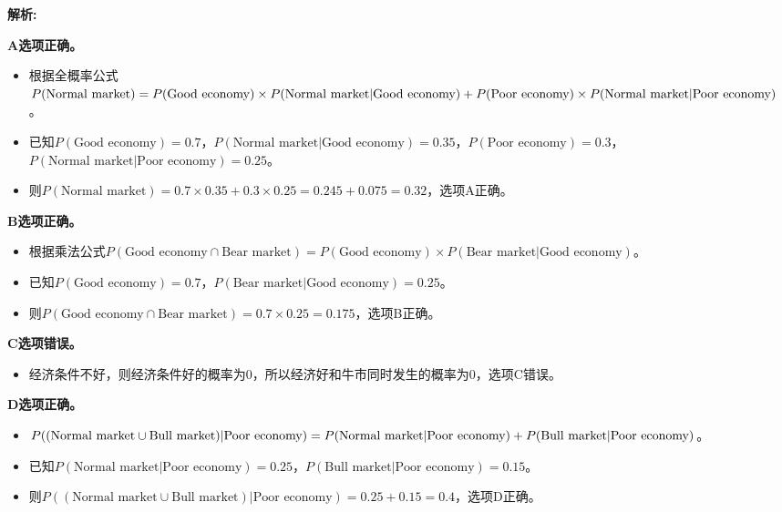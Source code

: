 \documentclass{article}
\newenvironment{explanation}
{\textbf{解析:}\par}
{\par}
\begin{document}
    \begin{explanation}
        \textbf{A选项正确。}
        \begin{itemize}
            \item 根据全概率公式\(P(\text{Normal market})=P(\text{Good economy})\times P(\text{Normal market}|\text{Good economy})\\+P(\text{Poor economy})\times P(\text{Normal market}|\text{Poor economy})\)。
            \item 已知\(P(\text{Good economy}) = 0.7\)，\(P(\text{Normal market}|\text{Good economy})=0.35\)，\(P(\text{Poor economy}) = 0.3\)，\\ \(P(\text{Normal market}|\text{Poor economy})=0.25\)。
            \item 则\(P(\text{Normal market})=0.7\times0.35 + 0.3\times0.25=0.245+0.075 = 0.32\)，选项A正确。
        \end{itemize}
    
        \textbf{B选项正确。}
        \begin{itemize}
            \item 根据乘法公式\(P(\text{Good economy}\cap\text{Bear market})=P(\text{Good economy})\times P(\text{Bear market}|\text{Good economy})\)。
            \item 已知\(P(\text{Good economy}) = 0.7\)，\(P(\text{Bear market}|\text{Good economy})=0.25\)。
            \item 则\(P(\text{Good economy}\cap\text{Bear market})=0.7\times0.25 = 0.175\)，选项B正确。
        \end{itemize}
    
        \textbf{C选项错误。}
        \begin{itemize}
            \item  经济条件不好，则经济条件好的概率为0，所以经济好和牛市同时发生的概率为0，选项C错误。
        \end{itemize}
    
        \textbf{D选项正确。}
        \begin{itemize}
            \item \(P((\text{Normal market}\cup\text{Bull market})|\text{Poor economy})=P(\text{Normal market}|\text{Poor economy})\\ +P(\text{Bull market}|\text{Poor economy})\)。
            \item 已知\(P(\text{Normal market}|\text{Poor economy})=0.25\)，\(P(\text{Bull market}|\text{Poor economy})=0.15\)。
            \item 则\(P((\text{Normal market}\cup\text{Bull market})|\text{Poor economy})=0.25+0.15=0.4\)，选项D正确。
        \end{itemize}
    \end{explanation}
\end{document}
